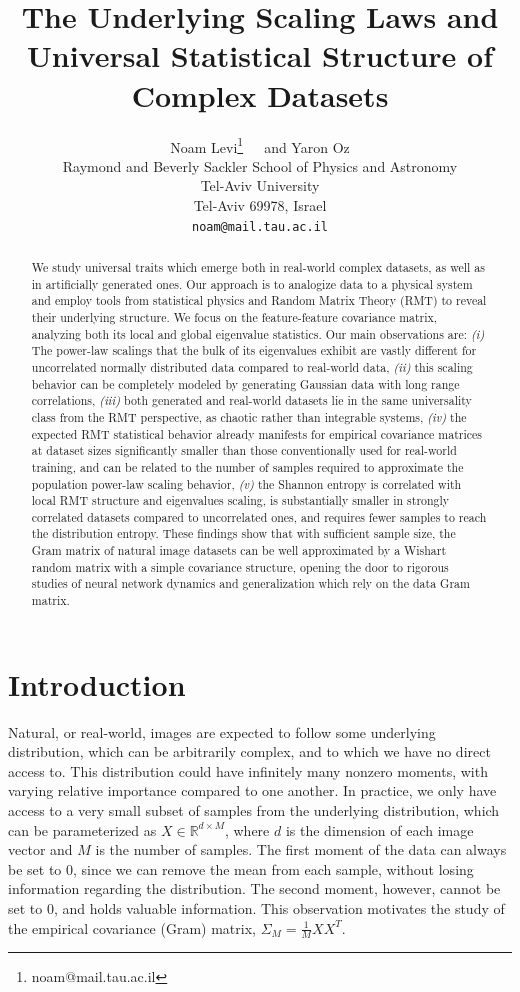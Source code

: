 \documentclass{article}
\title{The Underlying Scaling Laws and Universal Statistical Structure of Complex Datasets }
\author{%
  Noam Levi\thanks{noam@mail.tau.ac.il}~~~and Yaron Oz \\
  Raymond and Beverly Sackler School of Physics and Astronomy\\
  Tel-Aviv University\\
  Tel-Aviv 69978, Israel \\
  \texttt{noam@mail.tau.ac.il} \\
}
\begin{document}
\maketitle


\begin{abstract}

We study universal traits which emerge both in real-world complex datasets, as well as in artificially generated ones. Our approach is to analogize data to a physical system and employ tools from statistical physics and Random Matrix Theory (RMT) to reveal their underlying structure. We focus on the feature-feature covariance matrix, analyzing both its local and global eigenvalue statistics. Our main observations are: {\it(i)} The power-law scalings that the bulk of its eigenvalues exhibit are vastly different for uncorrelated normally distributed data compared to real-world data, {\it(ii)} this scaling behavior can be completely modeled by generating Gaussian data with long range correlations, {\it(iii)} both generated and real-world datasets lie in the same universality class from the RMT perspective, as chaotic rather than integrable systems, {\it(iv)} the expected RMT statistical behavior already manifests for empirical covariance matrices at dataset sizes significantly smaller than those conventionally used for real-world training, and can be related to the number of samples required to approximate the population power-law scaling behavior, {\it(v)} the Shannon entropy is correlated with local RMT structure and eigenvalues scaling, is substantially smaller in strongly correlated datasets compared to uncorrelated ones, and requires fewer samples to reach the distribution entropy. These findings show that with sufficient sample size, the Gram matrix of natural image datasets can be well approximated by a Wishart random matrix with a simple covariance structure, opening the door to rigorous studies of neural network dynamics and generalization which rely on the data Gram matrix.

\end{abstract}




\section{Introduction}

Natural, or real-world, images are expected to follow some underlying distribution, which can be arbitrarily complex, and to which we have no direct access to. This distribution could have infinitely many nonzero moments, with varying relative importance compared to one another. In practice, we only have access to a very small subset of samples from the underlying distribution, which can be parameterized as $X \in \mathbb{R}^{d\times M}$, where $d$ is the dimension of each image vector and $M$ is the number of samples. The first moment of the data can always be set to $0$, since we can remove the mean from each sample, without losing information regarding the distribution. The second moment, however, cannot be set to $0$, and holds valuable information. This observation motivates the study of the empirical covariance (Gram) matrix, $\Sigma_M = \tfrac{1}{M} X X^T$. 
\end{document}
